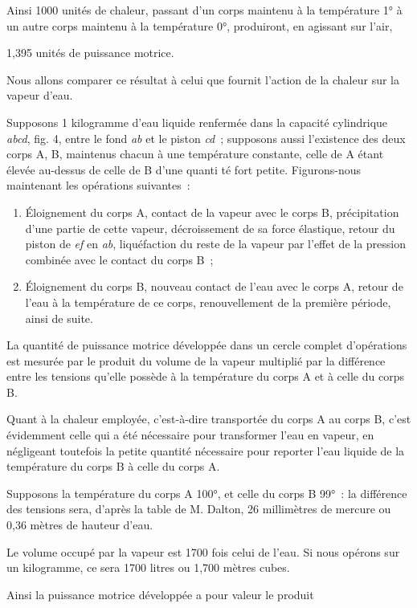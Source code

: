 \documentclass[french,twoside]{book} %
\begin{document}
\noindent Ainsi 1000 unités de chaleur, passant d’un corps maintenu à la température 1° à un autre corps maintenu à la température 0°, produiront, en agissant sur l’air,\par

\begin{center}
1,395 unités de puissance motrice.\par
\end{center}

\noindent Nous allons comparer ce résultat à celui que fournit l’action de la chaleur sur la vapeur d’eau.\par
Supposons 1 kilogramme d’eau liquide renfermée dans la capacité cylindrique \emph{abcd}, fig. 4, entre le fond \emph{ab} et le piston \emph{cd} ; supposons aussi l’existence des deux corps A, B, maintenus chacun à une température constante, celle de A étant élevée au-dessus de celle de B d’une quanti té fort petite. Figurons-nous maintenant les opérations suivantes :\par

\begin{enumerate}[itemsep=0pt,topsep=0pt,partopsep=0pt,parskip=0pt]
Contact de l’eau avec le corps A, passage du piston de la position \emph{cd} à la position \emph{ef} formation de la vapeur à la température du corps A pour remplir le vide auquel donne lieu l’extension de la capacité : nous supposerons la capacité \emph{abef} assez grande pour que toute l’eau y soit contenue à l’état de vapeur ;\item Éloignement du corps A, contact de la vapeur avec le corps B, précipitation d’une partie de cette vapeur, décroissement de sa force élastique, retour du piston de \emph{ef} en \emph{ab}, liquéfaction du reste de la vapeur par l’effet de la pression combinée avec le contact du corps B ;
\item Éloignement du corps B, nouveau contact de l’eau avec le corps A, retour de l’eau à la température de ce corps, renouvellement de la première période, ainsi de suite.
\end{enumerate}

\noindent La quantité de puissance motrice développée dans un cercle complet d’opérations est mesurée par le produit du volume de la vapeur multiplié par la différence entre les tensions qu’elle possède à la température du corps A et à celle du corps B.\par
Quant à la chaleur employée, c’est-à-dire transportée du corps A au corps B, c’est évidemment celle qui a été nécessaire pour transformer l’eau en vapeur, en négligeant toutefois la petite quantité nécessaire pour reporter l’eau liquide de la température du corps B à celle du corps A.\par
Supposons la température du corps A 100°, et celle du corps B 99° : la différence des tensions sera, d’après la table de M. Dalton, 26 millimètres de mercure ou 0,36 mètres de hauteur d’eau.\par
Le volume occupé par la vapeur est 1700 fois celui de l’eau. Si nous opérons sur un kilogramme, ce sera 1700 litres ou 1,700 mètres cubes.\par
Ainsi la puissance motrice développée a pour valeur le produit\par
\end{document}
